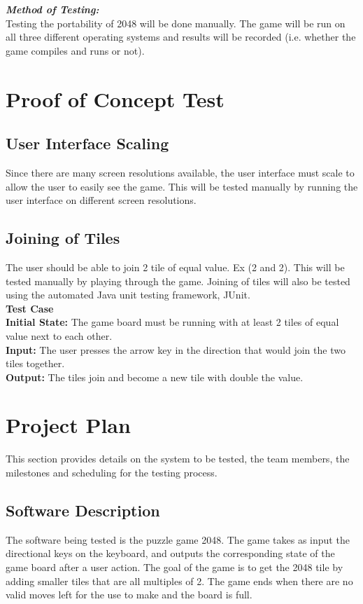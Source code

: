 \documentclass[12pt]{article}
\begin{document}
\textbf{\emph{Method of Testing:}}\\
Testing the portability of 2048 will be done manually. The game will be run on 
all three different operating systems and results will be recorded (i.e. 
whether the game compiles and runs or not).


\section{Proof of Concept Test}

\subsection{User Interface Scaling}
Since there are many screen resolutions available, the user interface must 
scale to allow the user to easily see the game. This will be tested manually by 
running the user interface on different screen resolutions.

\subsection{Joining of Tiles}
The user should be able to join 2 tile of equal value. Ex (2 and 2). This will 
be tested manually by playing through the game. Joining of tiles will also be 
tested using the automated Java unit testing framework, JUnit.\\

\textbf{Test Case}\\
\textbf{Initial State:} The game board must be running with at least 2 tiles of 
equal value next to each other. \\
\textbf{Input:} The user presses the arrow key in the direction that would join 
the two tiles together. \\
\textbf{Output:} The tiles join and become a new tile with double the value.\\

\section{Project Plan}
This section provides details on the system to be tested, the team members, the 
milestones and scheduling for the testing process.

\subsection{Software Description}
The software being tested is the puzzle game 2048. The game takes as input the 
directional keys on the keyboard, and outputs the corresponding state of the 
game board after a user action. The goal of the game is to get the 2048 tile by 
adding smaller tiles that are all multiples of 2. The game ends when there are 
no valid moves left for the use to make and the board is full. 
\end{document}
